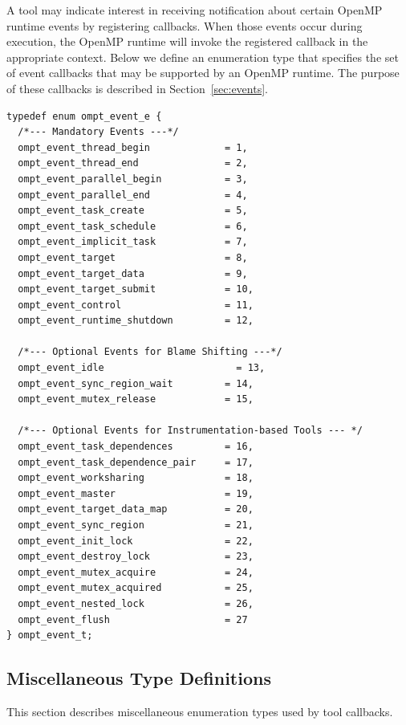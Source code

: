 \documentclass{article}
\begin{document}
A tool may indicate interest in receiving notification about certain OpenMP runtime events by registering callbacks. 
When those events occur during execution, the OpenMP runtime will invoke the registered callback in the appropriate context.
Below we define an enumeration type that specifies the set of event callbacks that may be supported by an OpenMP runtime. 
The purpose of these callbacks is described in Section~\ref{sec:events}. 

\begin{verbatim}
typedef enum ompt_event_e {  
  /*--- Mandatory Events ---*/
  ompt_event_thread_begin             = 1,  
  ompt_event_thread_end               = 2,  
  ompt_event_parallel_begin           = 3,  
  ompt_event_parallel_end             = 4,  
  ompt_event_task_create              = 5,  
  ompt_event_task_schedule            = 6,
  ompt_event_implicit_task            = 7,      
  ompt_event_target                   = 8,  
  ompt_event_target_data              = 9,  
  ompt_event_target_submit            = 10,  
  ompt_event_control                  = 11,   
  ompt_event_runtime_shutdown         = 12,  

  /*--- Optional Events for Blame Shifting ---*/  	
  ompt_event_idle	                    = 13,   
  ompt_event_sync_region_wait         = 14, 
  ompt_event_mutex_release            = 15, 

  /*--- Optional Events for Instrumentation-based Tools --- */      	      
  ompt_event_task_dependences         = 16,  
  ompt_event_task_dependence_pair     = 17,   				    				   	
  ompt_event_worksharing              = 18,  		              	 			    
  ompt_event_master                   = 19,  
  ompt_event_target_data_map          = 20, 	          	 			   
  ompt_event_sync_region              = 21,  
  ompt_event_init_lock                = 22,  
  ompt_event_destroy_lock             = 23, 								    
  ompt_event_mutex_acquire            = 24,  
  ompt_event_mutex_acquired           = 25,  
  ompt_event_nested_lock              = 26,   			            	 			         
  ompt_event_flush                    = 27  
} ompt_event_t;
\end{verbatim}

\clearpage  
\subsection{Miscellaneous Type Definitions}
\label{appendix:ompt-types:misc}
This section describes miscellaneous enumeration types used by tool callbacks.
\end{document}

